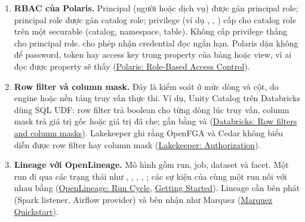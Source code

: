 \begin{enumerate}
\begin{itemize}
    \item Lakekeeper: chọn authorizer OpenFGA hoặc Cedar (\href{https://docs.lakekeeper.io/docs/nightly/authorization/}{Lakekeeper: Authorization}).
    \item AWS Glue Data Catalog: Iceberg REST endpoint dạng , xác thực SigV4 với signing name , tham số  là catalog ID (\href{https://docs.aws.amazon.com/glue/latest/dg/connect-glu-iceberg-rest.html}{AWS Glue: Iceberg REST endpoint}).
    \item {}: chỉ để học và test.
  \end{itemize}
  \item \textbf{RBAC của Polaris.} Principal (người hoặc dịch vụ) được gán principal role; principal role được gán catalog role; privilege (ví dụ , , ) cấp cho catalog role trên một securable (catalog, namespace, table). Không cấp privilege thẳng cho principal role.  cho phép nhận credential đọc ngắn hạn. Polaris dặn không để password, token hay access key trong property của bảng hoặc view, vì ai đọc được property sẽ thấy (\href{https://polaris.apache.org/in-dev/unreleased/managing-security/access-control/}{Polaris: Role-Based Access Control}).
  \item \textbf{Row filter và column mask.} Đây là kiểm soát ở mức dòng và cột, do engine hoặc nền tảng truy vấn thực thi. Ví dụ, Unity Catalog trên Databricks dùng SQL UDF: row filter trả boolean cho từng dòng lúc truy vấn, column mask trả giá trị gốc hoặc giá trị đã che; gắn bằng  và  (\href{https://docs.databricks.com/aws/en/data-governance/unity-catalog/filters-and-masks/}{Databricks: Row filters and column masks}). Lakekeeper ghi rằng OpenFGA và Cedar không biểu diễn được row filter hay column mask (\href{https://docs.lakekeeper.io/docs/nightly/authorization/}{Lakekeeper: Authorization}).
  \item \textbf{Lineage với OpenLineage.} Mô hình gồm run, job, dataset và facet. Một run đi qua các trạng thái như , , , , ; các sự kiện của cùng một run nối với nhau bằng  (\href{https://openlineage.io/docs/spec/run-cycle/}{OpenLineage: Run Cycle}, \href{https://openlineage.io/getting-started/}{Getting Started}). Lineage cần bên phát (Spark listener, Airflow provider) và bên nhận như Marquez (\href{https://marquezproject.ai/docs/quickstart/}{Marquez Quickstart}).

\end{enumerate}
